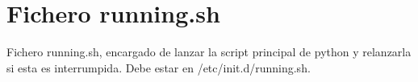 
\chapter{Fichero running.sh} %

\label{app:running} %

Fichero running.sh, encargado de lanzar la script principal de python y relanzarla si esta es interrumpida. Debe estar en /etc/init.d/running.sh.

\newpage


